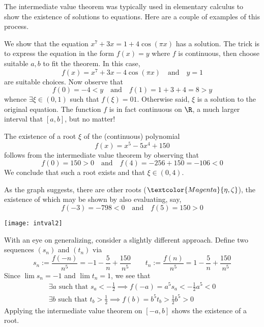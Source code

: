 \begin{examples}{}{}
	The intermediate value theorem was typically used in elementary calculus to show the existence of solutions to equations. Here are a couple of examples of this process.
	\begin{enumerate}
	  \item We show that the equation $x^7+3x=1+4\cos(\pi x)$ has a solution.\smallbreak
		The trick is to express the equation in the form $f(x)=y$ where $f$ is continuous, then choose suitable $a,b$ to fit the theorem. In this case,
		\[f(x)=x^7+3x-4\cos(\pi x)\quad\text{and}\quad y=1\]
		are suitable choices. Now observe that
		\[f(0)=-4<y\quad\text{and}\quad f(1)=1+3+4=8>y \tag{i.e., $a=0$ and $b=1$}\]
		whence $\exists\xi\in(0,1)$ such that $f(\xi)=01$. Otherwise said, $\xi$ is a solution to the original equation.\smallbreak
		The function $f$ is in fact continuous on $\R$, a much larger interval that $[a,b]$, but no matter!
		
		\goodbreak
		
		
	\begin{minipage}[t]{0.7\linewidth}\vspace{0pt}
		\item\label{ex:oddpolyroot2} The existence of a root $\xi$ of the (continuous) polynomial
		\[
			f(x)=x^5-5x^4+150
		\]
		follows from the intermediate value theorem by observing that
		\[
			f(0)=150>0\quad\text{and}\quad f(4)=-256+150=-106<0
		\]
		We conclude that such a root exists and that $\xi\in(0,4)$.\par
		As the graph suggests, there are other roots ($\textcolor{Magenta}{\eta,\zeta}$), the existence of which may be shown by also evaluating, say,
		\[
			f(-3)=-798<0\quad\text{and}\quad f(5)=150>0
		\]
	\end{minipage}\begin{minipage}[t]{0.3\linewidth}\vspace{0pt}
		\flushright\texttt{[image: intval2]}
	\end{minipage}
	\smallbreak

		With an eye on generalizing, consider a slightly different approach. Define two sequences $(s_n)$ and $(t_n)$ via
		\[
			s_n:=\frac{f(-n)}{n^5} =-1-\frac{5}n+\frac{150}{n^5}
			\qquad
			t_n:=\frac{f(n)}{n^5}= 1-\frac{5}n+\frac{150}{n^5}
		\]
		Since $\lim s_n=-1$ and $\lim t_n=1$,  we see that
		\begin{gather*}
			\exists a\text{ such that }s_a<-\frac 12\implies f(-a)=a^5s_a<-\frac 12a^5<0\\
			\exists b\text{ such that }t_b>\frac 12\implies f(b)=b^5t_b>\frac 12b^5>0
		\end{gather*}
		Applying the intermediate value theorem on $[-a,b]$ shows the existence of a root.
	\end{enumerate}
\end{examples}

